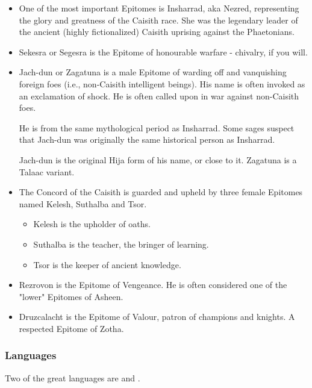 \begin{itemize}
    \item 
        One of the most important Epitomes is Insharrad, aka Nezred, representing the glory and greatness of the Caisith race. She was the legendary leader of the ancient (highly fictionalized) Caisith uprising against the Phaetonians. 
    \item Sekesra or Segesra is the Epitome of honourable warfare - chivalry, if you will. 
    \item
        Jach-dun or Zagatuna is a male Epitome of warding off and vanquishing foreign foes (i.e., non-Caisith intelligent beings). His name is often invoked as an exclamation of shock. He is often called upon in war against non-Caisith foes.
        
        He is from the same mythological period as Insharrad. Some sages suspect that Jach-dun was originally the same historical person as Insharrad.
        
        Jach-dun is the original Hija form of his name, or close to it. Zagatuna is a Talaac variant. 

    \item 
        The Concord of the Caisith is guarded and upheld by three female Epitomes named Kelesh, Suthalba and Tsor. 
        \begin{itemize}
            \item Kelesh is the upholder of oaths. 
            \item Suthalba is the teacher, the bringer of learning. 
            \item Tsor is the keeper of ancient knowledge. 
        \end{itemize}
    
    \item 
        Rezrovon is the Epitome of Vengeance. He is often considered one of the "lower" Epitomes of Asheen. 

    \item 
        Druzcalacht is the Epitome of Valour, patron of champions and knights. A respected Epitome of Zotha. 

\end{itemize}






\subsubsection{Languages}
Two of the great \caisith languages are  and . 





